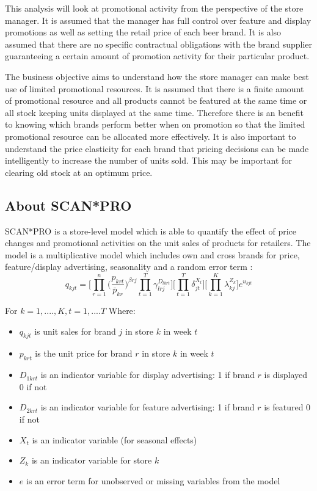 \documentclass[a4paper,11pt]{article}
\begin{document}
This analysis will look at promotional activity from the perspective of the store manager. It is assumed that the manager has full control over feature and display promotions as well as setting the retail price of each beer brand. It is also assumed that there are no specific contractual obligations with the brand supplier guaranteeing a certain amount of promotion activity for their particular product. 

The business objective aims to understand how the store manager can make best use of limited promotional resources. It is assumed that there is a finite amount of promotional resource and all products cannot be featured at the same time or all stock keeping units displayed at the same time. Therefore there is an benefit to knowing which brands perform better when on promotion so that the limited promotional resource can be allocated more effectively. It is also important to understand the price elasticity for each brand that pricing decisions can be made intelligently to increase the number of units sold. This may be important for clearing old stock at an optimum price.


\subsection{About SCAN*PRO}

SCAN*PRO is a store-level model which is able to quantify the effect of price changes and promotional activities on the unit sales of products for retailers. The model is a multiplicative model which includes own and cross brands for price, feature/display advertising, seasonality and a random error term \citep{leeflang_how_2002}:
\begin{equation}
\label{eqn:scanpro}
    q_{kjt} = \Bigg[\prod_{r=1}^n\Bigg(\frac{p_{krt}}{\bar{p}_{kr}}\Bigg)^{\beta rj}\prod_{t=1}^{T}\gamma_{lrj}^{D_{lkrt}}\Bigg]\Bigg[\prod_{t=1}^{T}\delta_{jt}^{X_{t}}\Bigg]\Bigg[\prod_{k=1}^{K}\lambda_{kj}^{Z_{k}}\Bigg]e^{u_{kjt}} 
\end{equation}

For $k = 1, ...., K, t=1,....T$
\newline
\newline
Where:
\begin{itemize}
    \item $q_{kjt}$ is unit sales for brand $j$ in store $k$ in week $t$
    \item $p_{krt}$ is the unit price for brand $r$ in store $k$ in week $t$
    \item $D_{1krt}$ is an indicator variable for display advertising: 1 if brand $r$ is displayed 0 if not
    \item $D_{2krt}$ is an indicator variable for feature advertising: 1 if brand $r$ is featured 0 if not
    \item $X_t$ is an indicator variable (for seasonal effects)
    \item $Z_k$ is an indicator variable for store $k$
    \item $e$ is an error term for unobserved or missing variables from the model
\end{itemize}
\end{document}
